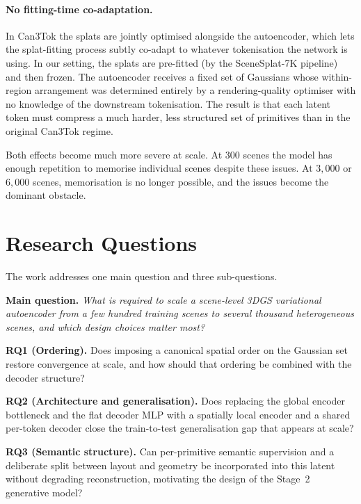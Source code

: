 \paragraph{No fitting-time co-adaptation.} In Can3Tok the splats are jointly optimised alongside the autoencoder, which lets the splat-fitting process subtly co-adapt to whatever tokenisation the network is using. In our setting, the splats are pre-fitted (by the SceneSplat-7K pipeline) and then frozen. The autoencoder receives a fixed set of Gaussians whose within-region arrangement was determined entirely by a rendering-quality optimiser with no knowledge of the downstream tokenisation. The result is that each latent token must compress a much harder, less structured set of primitives than in the original Can3Tok regime.

Both effects become much more severe at scale. At $300$ scenes the model has enough repetition to memorise individual scenes despite these issues. At $3{,}000$ or $6{,}000$ scenes, memorisation is no longer possible, and the issues become the dominant obstacle.

\section{Research Questions}
\label{sec:intro_rqs}

The work addresses one main question and three sub-questions.

\medskip
\noindent\textbf{Main question.} \textit{What is required to scale a scene-level 3DGS variational autoencoder from a few hundred training scenes to several thousand heterogeneous scenes, and which design choices matter most?}

\medskip
\noindent\textbf{RQ1 (Ordering).} Does imposing a canonical spatial order on the Gaussian set restore convergence at scale, and how should that ordering be combined with the decoder structure?

\noindent\textbf{RQ2 (Architecture and generalisation).} Does replacing the global encoder bottleneck and the flat decoder MLP with a spatially local encoder and a shared per-token decoder close the train-to-test generalisation gap that appears at scale?

\noindent\textbf{RQ3 (Semantic structure).} Can per-primitive semantic supervision and a deliberate split between layout and geometry be incorporated into this latent without degrading reconstruction, motivating the design of the Stage~2 generative model?

